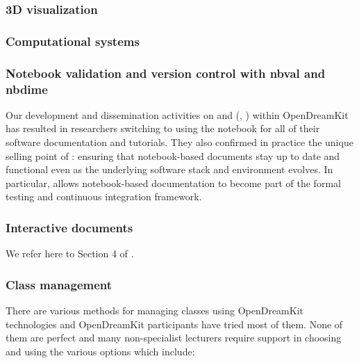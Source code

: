 \documentclass{deliverablereport}
\begin{document}
\subsubsection{3D visualization}

\subsubsection{Computational systems}

\subsubsection{Notebook validation and version control with nbval and nbdime}

Our development and dissemination activities on \nbval and \nbdime
(, ) within
OpenDreamKit has resulted in researchers switching to using the
notebook for all of their software documentation and tutorials. They
also confirmed in practice the unique selling point of \nbval:
ensuring that notebook-based documents stay up to date and functional
even as the underlying software stack and environment evolves. In
particular, \nbval allows notebook-based documentation to become part
of the formal testing and continuous integration framework.

\subsubsection{Interactive documents}

We refer here to Section 4 of .

\subsubsection{Class management}

There are various methods for managing classes using OpenDreamKit
technologies and OpenDreamKit participants have tried most of them. None
of them are perfect and many non-specialist lecturers require support in
choosing and using the various options which include:
\end{document}
